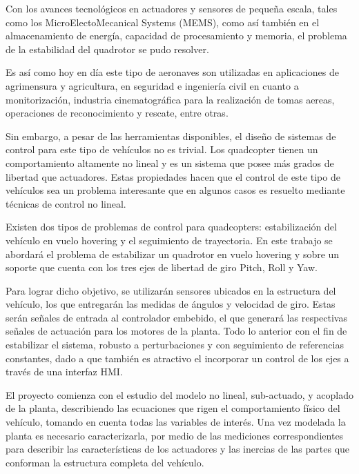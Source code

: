 \documentclass[../main.tex]{subfiles}
\begin{document}
\textcompwordmark{}

Con los avances tecnológicos en actuadores y sensores de pequeña escala,
tales como los MicroElectoMecanical Systems (MEMS), como así también
en el almacenamiento de energía, capacidad de procesamiento y memoria,
el problema de la estabilidad del quadrotor se pudo resolver.

Es así como hoy en día este tipo de aeronaves son utilizadas en aplicaciones
de agrimensura y agricultura, en seguridad e ingeniería civil en cuanto
a monitorización, industria cinematográfica para la realización de
tomas aereas, operaciones de reconocimiento y rescate, entre otras.

\textcompwordmark{}

Sin embargo, a pesar de las herramientas disponibles, el diseño de
sistemas de control para este tipo de vehículos no es trivial. Los
quadcopter tienen un comportamiento altamente no lineal y es un sistema
que posee más grados de libertad que actuadores. Estas propiedades
hacen que el control de este tipo de vehículos sea un problema interesante
que en algunos casos es resuelto mediante técnicas de control no lineal.

\textcompwordmark{}

Existen dos tipos de problemas de control para quadcopters: estabilización
del vehículo en vuelo hovering y el seguimiento de trayectoria. En
este trabajo se abordará el problema de estabilizar un quadrotor en
vuelo hovering y sobre un soporte que cuenta con los tres ejes de
libertad de giro Pitch, Roll y Yaw. 

Para lograr dicho objetivo, se utilizarán sensores ubicados en la
estructura del vehículo, los que entregarán las medidas de ángulos
y velocidad de giro. Estas serán señales de entrada al controlador
embebido, el que generará las respectivas señales de actuación para
los motores de la planta. Todo lo anterior con el fin de estabilizar
el sistema, robusto a perturbaciones y con seguimiento de referencias
constantes, dado a que también es atractivo el incorporar un control
de los ejes a través de una interfaz HMI.

\textcompwordmark{}

El proyecto comienza con el estudio del modelo no lineal, sub-actuado,
y acoplado de la planta, describiendo las ecuaciones que rigen el
comportamiento físico del vehículo, tomando en cuenta todas las variables
de interés. Una vez modelada la planta es necesario caracterizarla,
por medio de las mediciones correspondientes para describir las características
de los actuadores y las inercias de las partes que conforman la estructura
completa del vehículo. 
\end{document}
